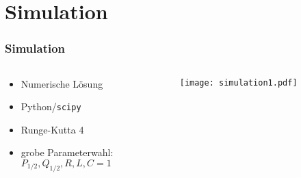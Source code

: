 \section{Simulation}

\begin{frame}
\frametitle{Simulation}
\begin{columns}
  \begin{column}{0.45\textwidth}
    \begin{itemize}
      \item Numerische Lösung\\
      \item Python/\texttt{scipy}\\
      \item Runge-Kutta 4
      \item grobe Parameterwahl:\\
      {$P_{1/2}, Q_{1/2}, R, L, C = 1$}
    \end{itemize}
  \end{column}
  \begin{column}{0.55\textwidth}
    \begin{center}
      \centering
      \texttt{[image: simulation1.pdf]}\\
    \end{center}
  \end{column}
\end{columns}


\end{frame}
